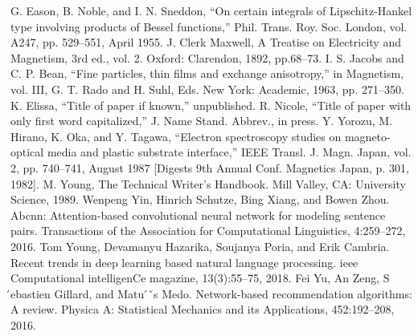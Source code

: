 \documentclass[conference]{IEEEtran}
\begin{document}
\begin{thebibliography}{00}
     G. Eason, B. Noble, and I. N. Sneddon, ``On certain integrals of Lipschitz-Hankel type involving products of Bessel functions,'' Phil. Trans. Roy. Soc. London, vol. A247, pp. 529--551, April 1955.
     J. Clerk Maxwell, A Treatise on Electricity and Magnetism, 3rd ed., vol. 2. Oxford: Clarendon, 1892, pp.68--73.
     I. S. Jacobs and C. P. Bean, ``Fine particles, thin films and exchange anisotropy,'' in Magnetism, vol. III, G. T. Rado and H. Suhl, Eds. New York: Academic, 1963, pp. 271--350.
     K. Elissa, ``Title of paper if known,'' unpublished.
     R. Nicole, ``Title of paper with only first word capitalized,'' J. Name Stand. Abbrev., in press.
     Y. Yorozu, M. Hirano, K. Oka, and Y. Tagawa, ``Electron spectroscopy studies on magneto-optical media and plastic substrate interface,'' IEEE Transl. J. Magn. Japan, vol. 2, pp. 740--741, August 1987 [Digests 9th Annual Conf. Magnetics Japan, p. 301, 1982].
     M. Young, The Technical Writer's Handbook. Mill Valley, CA: University Science, 1989.
     Wenpeng Yin, Hinrich Schutze, Bing Xiang, and Bowen Zhou. Abcnn: Attention-based convolutional neural network for modeling sentence pairs. Transactions of the Association for Computational Linguistics, 4:259–272, 2016.
     Tom Young, Devamanyu Hazarika, Soujanya Poria, and Erik Cambria. Recent trends in deep learning based natural language processing. ieee Computational intelligenCe magazine, 13(3):55–75, 2018.
     Fei Yu, An Zeng, S ́ebastien Gillard, and Matu ́ˇs Medo. Network-based recommendation algorithms: A review. Physica A: Statistical Mechanics and its Applications, 452:192–208, 2016.
\end{thebibliography}

% 
\end{document}
